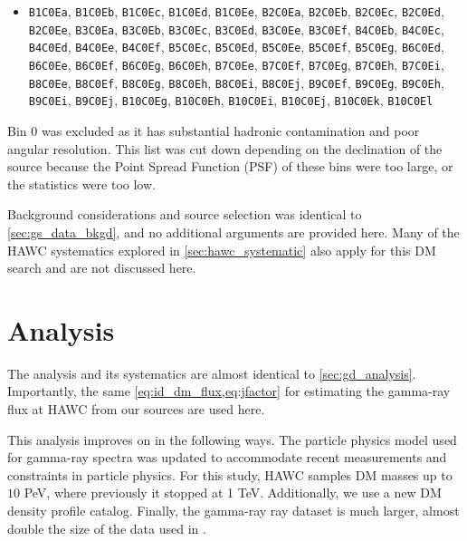 \begin{itemize}
    \item[] \texttt{B1C0Ea}, \texttt{B1C0Eb}, \texttt{B1C0Ec}, \texttt{B1C0Ed}, \texttt{B1C0Ee}, \texttt{B2C0Ea}, \texttt{B2C0Eb}, \texttt{B2C0Ec}, \texttt{B2C0Ed}, \texttt{B2C0Ee}, \texttt{B3C0Ea}, \texttt{B3C0Eb}, \texttt{B3C0Ec}, \texttt{B3C0Ed}, \texttt{B3C0Ee}, \texttt{B3C0Ef}, \texttt{B4C0Eb}, \texttt{B4C0Ec}, \texttt{B4C0Ed}, \texttt{B4C0Ee}, \texttt{B4C0Ef}, \texttt{B5C0Ec}, \texttt{B5C0Ed}, \texttt{B5C0Ee}, \texttt{B5C0Ef}, \texttt{B5C0Eg}, \texttt{B6C0Ed}, \texttt{B6C0Ee}, \texttt{B6C0Ef}, \texttt{B6C0Eg}, \texttt{B6C0Eh}, \texttt{B7C0Ee}, \texttt{B7C0Ef}, \texttt{B7C0Eg}, \texttt{B7C0Eh}, \texttt{B7C0Ei}, \texttt{B8C0Ee}, \texttt{B8C0Ef}, \texttt{B8C0Eg}, \texttt{B8C0Eh}, \texttt{B8C0Ei}, \texttt{B8C0Ej}, \texttt{B9C0Ef}, \texttt{B9C0Eg}, \texttt{B9C0Eh}, \texttt{B9C0Ei}, \texttt{B9C0Ej}, \texttt{B10C0Eg}, \texttt{B10C0Eh}, \texttt{B10C0Ei}, \texttt{B10C0Ej}, \texttt{B10C0Ek}, \texttt{B10C0El}
\end{itemize}
Bin 0 was excluded as it has substantial hadronic contamination and poor angular resolution.
This list was cut down depending on the declination of the source because the Point Spread Function (PSF) of these bins were too large, or the statistics were too low.

Background considerations and source selection was identical to \cref{sec:gs_data_bkgd}, and no additional arguments are provided here.
Many of the HAWC systematics explored in \cref{sec:hawc_systematic} also apply for this DM search and are not discussed here.

\section{Analysis}\label{sec:mtd_analysis}

The analysis and its systematics are almost identical to \cref{sec:gd_analysis}.
Importantly, the same \cref{eq:id_dm_flux,eq:jfactor} for estimating the gamma-ray flux at HAWC from our sources are used here.

This analysis improves on  in the following ways.
The particle physics model used for gamma-ray spectra was updated to accommodate recent measurements and constraints in particle physics.
For this study, HAWC samples DM masses up to $10$ PeV, where previously it stopped at 1 TeV.
Additionally, we use a new DM density profile catalog.
Finally, the gamma-ray ray dataset is much larger, almost double the size of the data used in .

